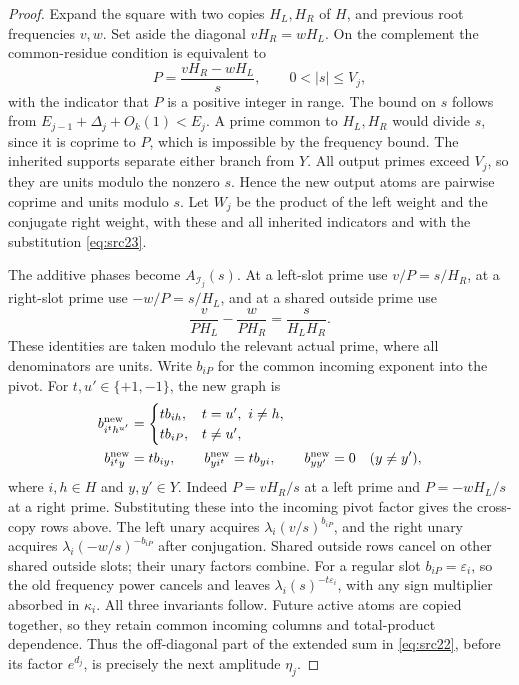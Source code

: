 \begin{proof}
Expand the square with two copies \(H_L,H_R\) of \(H\), and
previous root frequencies \(v,w\). Set aside the diagonal
\(vH_R=wH_L\). On the complement the common-residue condition
is equivalent to
\begin{equation}\label{eq:src23}
 P=\frac{vH_R-wH_L}{s},\qquad 0<|s|\le V_j,
\end{equation}
with the indicator that \(P\) is a positive integer in range.
The bound on \(s\) follows from
\(E_{j-1}+\Delta_j+O_k(1)<E_j\).
A prime common to \(H_L,H_R\) would divide \(s\), since it is
coprime to \(P\), which is impossible by the frequency bound.
The inherited supports separate either branch from \(Y\).
All output primes exceed \(V_j\), so they are units modulo
the nonzero \(s\). Hence the new output atoms are pairwise
coprime and units modulo \(s\).
Let \(W_j\) be the product of the left weight and the conjugate
right weight, with these and all inherited indicators and with
the substitution \eqref{eq:src23}.

The additive phases become \(A_{\mathcal I_j}(s)\).
At a left-slot prime use \(v/P=s/H_R\), at a right-slot prime
use \(-w/P=s/H_L\), and at a shared outside prime use
\[
 \frac{v}{PH_L}-\frac{w}{PH_R}
       =\frac{s}{H_LH_R}.
\]
These identities are taken modulo the relevant actual prime,
where all denominators are units.
Write \(b_{iP}\) for the common incoming exponent into the
pivot. For \(t,u'\in\{+1,-1\}\), the new graph is
\begin{align}
 b^{\rm new}_{i^t h^{u'}}
   &=
   \begin{cases}
     t b_{ih},&t=u',\ i\ne h,\\
     t b_{iP},&t\ne u',
   \end{cases}\notag\\
 b^{\rm new}_{i^t y}&=t b_{iy},\qquad
 b^{\rm new}_{y i^t}=t b_{yi},\qquad
 b^{\rm new}_{y y'}=0\quad(y\ne y'),
 \label{eq:src24}
\end{align}
where \(i,h\in H\) and \(y,y'\in Y\).
Indeed \(P=vH_R/s\) at a left prime and
\(P=-wH_L/s\) at a right prime. Substituting these into the
incoming pivot factor gives the cross-copy rows above.
The left unary acquires
\(\lambda_i(v/s)^{b_{iP}}\), and the right unary acquires
\(\lambda_i(-w/s)^{-b_{iP}}\) after conjugation.
Shared outside rows cancel on other shared outside slots;
their unary factors combine.
For a regular slot \(b_{iP}=\varepsilon_i\), so the old
frequency power cancels and leaves
\(\lambda_i(s)^{-t\varepsilon_i}\), with any sign multiplier
absorbed in \(\kappa_i\). All three invariants follow.
Future active atoms are copied together, so they retain common
incoming columns and total-product dependence.
Thus the off-diagonal part of the extended sum in
\eqref{eq:src22}, before its factor \(e^{d_j}\), is precisely
the next amplitude \(\eta_j\).


\end{proof}
